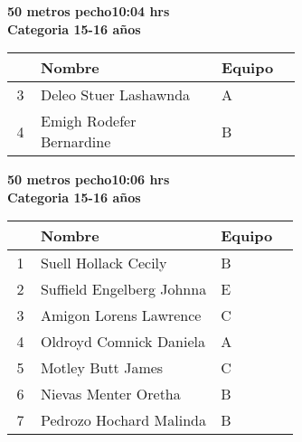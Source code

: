 \begin{minipage}{0.95\linewidth}\vspace{0.5cm} 
\begin{flushleft}
\textbf{
\hspace{-0.15cm}50 metros pecho\hspace{1.5cm}10:04 hrs \\Categoria 15-16 años}\vspace{-0.2cm} 
\end{flushleft}
\begin{tabular}{cp{0.63\linewidth}l}
\hline
& \textbf{Nombre} & \textbf{Equipo} \\ \hline
3 & Deleo Stuer Lashawnda & A \\ 
4 & Emigh Rodefer Bernardine & B \\ 
\end{tabular}
\end{minipage}
\begin{minipage}{0.95\linewidth}\vspace{0.5cm} 
\begin{flushleft}
\textbf{
\hspace{-0.15cm}50 metros pecho\hspace{1.5cm}10:06 hrs \\Categoria 15-16 años}\vspace{-0.2cm} 
\end{flushleft}
\begin{tabular}{cp{0.63\linewidth}l}
\hline
& \textbf{Nombre} & \textbf{Equipo} \\ \hline
1 & Suell Hollack Cecily & B \\ 
2 & Suffield Engelberg Johnna & E \\ 
3 & Amigon Lorens Lawrence & C \\ 
4 & Oldroyd Comnick Daniela & A \\ 
5 & Motley Butt James & C \\ 
6 & Nievas Menter Oretha & B \\ 
7 & Pedrozo Hochard Malinda & B \\ 
\end{tabular}
\end{minipage}

